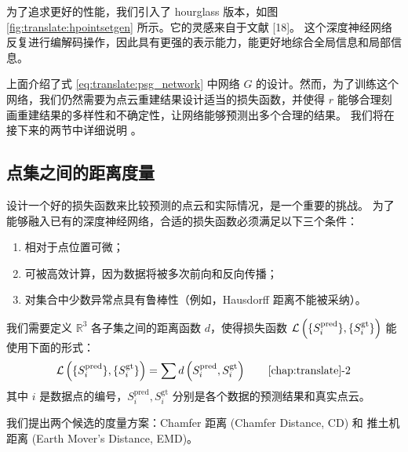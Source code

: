 为了追求更好的性能，我们引入了 hourglass 版本，如图 \ref{fig:translate:hpointsetgen} 所示。它的灵感来自于文献 [18]。
这个深度神经网络反复进行编解码操作，因此具有更强的表示能力，能更好地综合全局信息和局部信息。

上面介绍了式 \eqref{eq:translate:psg_network} 中网络 $G$ 的设计。然而，为了训练这个网络，我们仍然需要为点云重建结果设计适当的损失函数，并使得 $r$ 能够合理刻画重建结果的多样性和不确定性，让网络能够预测出多个合理的结果。
我们将在接下来的两节中详细说明%
。



\subsection{点集之间的距离度量 \label{section:translate:psg_loss}}
设计一个好的损失函数来比较预测的点云和实际情况，是一个重要的挑战。 为了能够融入已有的深度神经网络，合适的损失函数必须满足以下三个条件：
\begin{enumerate}
	\item 相对于点位置可微；
	\item 可被高效计算，因为数据将被多次前向和反向传播；
	\item 对集合中少数异常点具有鲁棒性（例如，Hausdorff 距离不能被采纳）。
\end{enumerate}

我们需要定义 $\mathbb{R}^3$ 各子集之间的距离函数 $d$，使得损失函数
$\mathcal{L}\left(\{S_i^{\text{pred}}\}, \{S_i^{\text{gt}}\}\right)$
能使用下面的形式：
\begin{align}
	\Loss\left(\{S_i^{\text{pred}}\}, \{S_i^{\text{gt}}\}\right)
	= \sum d\left(S_i^{\text{pred}}, S_i^{\text{gt}}\right)
	\tag*{\ref{chap:translate}-2} \label{eq:translate:psg_loss}
\end{align}
其中 $i$ 是数据点的编号，$S_i^{\text{pred}}, S_i^{\text{gt}}$ 分别是各个数据的预测结果和真实点云。

我们提出两个候选的度量方案：Chamfer 距离 (Chamfer Distance, CD) 和 推土机距离 (Earth Mover's Distance, EMD)\acite{[20]}。


